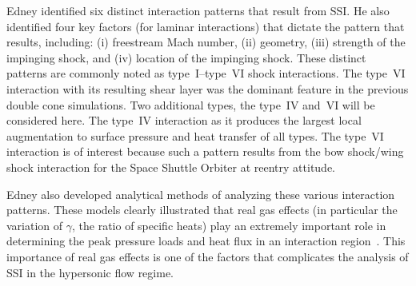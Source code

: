 Edney identified six distinct interaction patterns that result from SSI.  He also identified four key factors (for laminar interactions) that dictate the pattern that results, including: (i) freestream Mach number, (ii) geometry, (iii) strength of the impinging shock, and (iv) location of the impinging shock.  These distinct patterns are commonly noted as type~I--type~VI shock interactions. The type~VI interaction with its resulting shear layer was the dominant feature in the previous double cone simulations.  Two additional types, the type~IV and~VI will be considered here.  The type~IV interaction as it produces the largest local augmentation to surface pressure and heat transfer of all types.  The type~VI interaction is of interest because such a pattern results from the bow shock/wing shock interaction for the Space Shuttle Orbiter at reentry attitude.

Edney also developed analytical methods of analyzing these various interaction patterns.  These models clearly illustrated that real gas effects (in particular the variation of $\gamma$, the ratio of specific heats) play an extremely important role in determining the peak pressure loads and heat flux in an interaction region~\cite{edney-ssi}.  This importance of real gas effects is one of the factors that complicates the analysis of SSI in the hypersonic flow regime.


